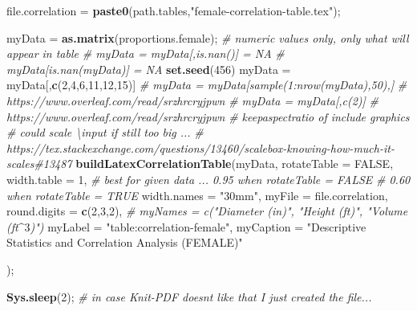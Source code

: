 \documentclass[]{article}
\newenvironment{Shaded}{\begin{snugshade}}{\end{snugshade}}
\newcommand{\CommentTok}[1]{\textcolor[rgb]{0.56,0.35,0.01}{\textit{#1}}}
\newcommand{\DataTypeTok}[1]{\textcolor[rgb]{0.13,0.29,0.53}{#1}}
\newcommand{\DecValTok}[1]{\textcolor[rgb]{0.00,0.00,0.81}{#1}}
\newcommand{\KeywordTok}[1]{\textcolor[rgb]{0.13,0.29,0.53}{\textbf{#1}}}
\newcommand{\NormalTok}[1]{#1}
\newcommand{\OtherTok}[1]{\textcolor[rgb]{0.56,0.35,0.01}{#1}}
\newcommand{\StringTok}[1]{\textcolor[rgb]{0.31,0.60,0.02}{#1}}
\begin{document}
\begin{Shaded}
\begin{Highlighting}[]
\NormalTok{file.correlation =}\StringTok{ }\KeywordTok{paste0}\NormalTok{(path.tables,}\StringTok{"female{-}correlation{-}table.tex"}\NormalTok{);}

\NormalTok{myData =}\StringTok{ }\KeywordTok{as.matrix}\NormalTok{(proportions.female);  }\CommentTok{\# numeric values only, only what will appear in table}
\CommentTok{\# myData = myData[,is.nan()] = NA}
\CommentTok{\# myData[is.nan(myData)] = NA}
\KeywordTok{set.seed}\NormalTok{(}\DecValTok{456}\NormalTok{)}
\NormalTok{myData =}\StringTok{ }\NormalTok{myData[,}\KeywordTok{c}\NormalTok{(}\DecValTok{2}\NormalTok{,}\DecValTok{4}\NormalTok{,}\DecValTok{6}\NormalTok{,}\DecValTok{11}\NormalTok{,}\DecValTok{12}\NormalTok{,}\DecValTok{15}\NormalTok{)]}
\CommentTok{\# myData = myData[sample(1:nrow(myData),50),]}
\CommentTok{\# https://www.overleaf.com/read/srzhrcryjpwn}
\CommentTok{\# myData = myData[,c(2)]}
\CommentTok{\# https://www.overleaf.com/read/srzhrcryjpwn}
\CommentTok{\# keepaspectratio of include graphics }
\CommentTok{\# could scale \textbackslash{}input if still too big ...}
\CommentTok{\# https://tex.stackexchange.com/questions/13460/scalebox{-}knowing{-}how{-}much{-}it{-}scales\#13487}
\KeywordTok{buildLatexCorrelationTable}\NormalTok{(myData, }
  \DataTypeTok{rotateTable =} \OtherTok{FALSE}\NormalTok{,}
  \DataTypeTok{width.table =} \DecValTok{1}\NormalTok{, }\CommentTok{\# best for given data ... 0.95 when rotateTable = FALSE}
                      \CommentTok{\# 0.60 when rotateTable = TRUE}
  \DataTypeTok{width.names =} \StringTok{"30mm"}\NormalTok{,}
  \DataTypeTok{myFile =}\NormalTok{ file.correlation,}
  \DataTypeTok{round.digits =} \KeywordTok{c}\NormalTok{(}\DecValTok{2}\NormalTok{,}\DecValTok{3}\NormalTok{,}\DecValTok{2}\NormalTok{),}
  \CommentTok{\# myNames = c("Diameter (in)", "Height (ft)", "Volume (ft$\^{}3$)") }
  \DataTypeTok{myLabel =} \StringTok{"table:correlation{-}female"}\NormalTok{,}
  \DataTypeTok{myCaption =} \StringTok{"Descriptive Statistics and Correlation Analysis (FEMALE)"}

\NormalTok{  );}

\KeywordTok{Sys.sleep}\NormalTok{(}\DecValTok{2}\NormalTok{); }\CommentTok{\# in case Knit{-}PDF doesn\textquotesingle{}t like that I just created the file...}
\end{Highlighting}
\end{Shaded}

\newpage
\end{document}
